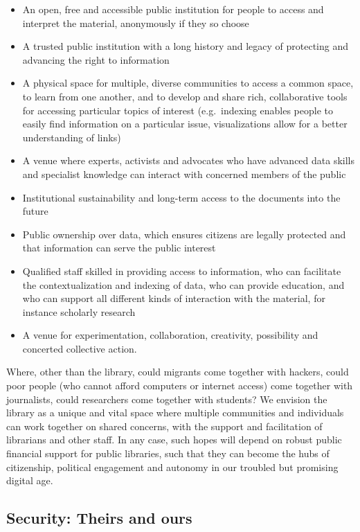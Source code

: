 \documentclass[a4paper,
fontsize=11pt,
oneside,
numbers=noperiodatend,
parskip=half-,
bibliography=totoc,
final
]{scrartcl}
\begin{document}
\begin{itemize}
\item
  An open, free and accessible public institution for people to access
  and interpret the material, anonymously if they so choose
\item
  A trusted public institution with a long history and legacy of
  protecting and advancing the right to information
\item
  A physical space for multiple, diverse communities to access a common
  space, to learn from one another, and to develop and share rich,
  collaborative tools for accessing particular topics of interest
  (e.g.~indexing enables people to easily find information on a
  particular issue, visualizations allow for a better understanding of
  links)
\item
  A venue where experts, activists and advocates who have advanced data
  skills and specialist knowledge can interact with concerned members of
  the public
\item
  Institutional sustainability and long-term access to the documents
  into the future
\item
  Public ownership over data, which ensures citizens are legally
  protected and that information can serve the public interest
\item
  Qualified staff skilled in providing access to information, who can
  facilitate the contextualization and indexing of data, who can provide
  education, and who can support all different kinds of interaction with
  the material, for instance scholarly research
\item
  A venue for experimentation, collaboration, creativity, possibility
  and concerted collective action.
\end{itemize}

Where, other than the library, could migrants come together with
hackers, could poor people (who cannot afford computers or internet
access) come together with journalists, could researchers come together
with students? We envision the library as a unique and vital space where
multiple communities and individuals can work together on shared
concerns, with the support and facilitation of librarians and other
staff. In any case, such hopes will depend on robust public financial
support for public libraries, such that they can become the hubs of
citizenship, political engagement and autonomy in our troubled but
promising digital age.

\subsection*{Security: Theirs and ours}\label{security-theirs-and-ours}
\end{document}
